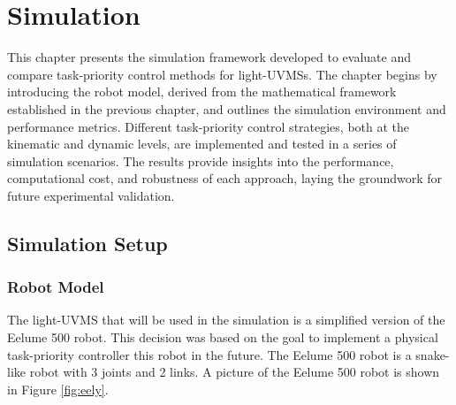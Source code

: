 \chapter{Simulation}

This chapter presents the simulation framework developed to evaluate and 
compare task-priority control methods for light-UVMSs. The chapter begins by 
introducing the robot model, derived from the mathematical framework 
established in the previous chapter, and outlines the simulation environment 
and performance metrics. Different task-priority control strategies, both at 
the kinematic and dynamic levels, are implemented and tested in a series of 
simulation scenarios. The results provide insights into the performance, 
computational cost, and robustness of each approach, laying the groundwork for 
future experimental validation.

\section{Simulation Setup}

\subsection{Robot Model}


The light-UVMS that will be used in the simulation is a simplified version of
the Eelume 500 robot. This decision was based on the goal to implement a physical
task-priority controller this robot in the future. The Eelume 500 robot is a
snake-like robot with 3 joints and 2 links.
A picture of the Eelume 500 robot is shown in Figure \ref{fig:eely}.


